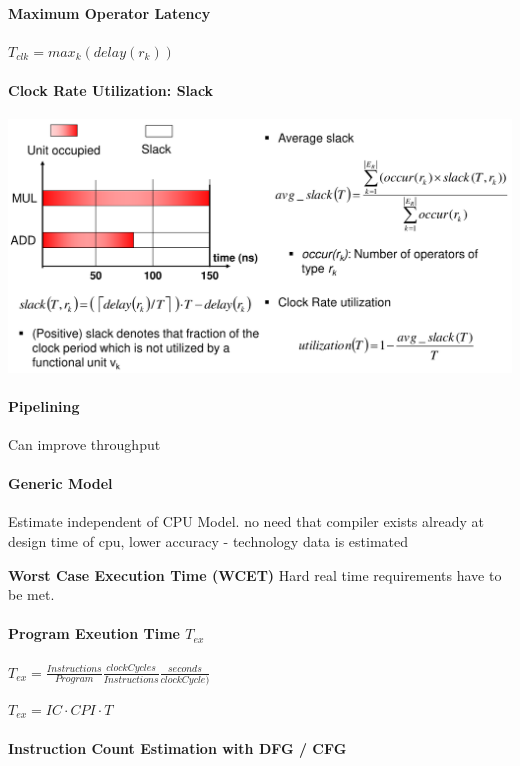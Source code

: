 \documentclass[english]{latex4ei/latex4ei_sheet}
\begin{document}
\paragraph{Maximum Operator Latency}
$T_{clk} = max_k(delay(r_k))$

\paragraph{Clock Rate Utilization: Slack}

\begin{center}
  \includegraphics[width=\linewidth]{assets/Slack.png}
  \label{fig:slack}
\end{center}

\paragraph{Pipelining} Can improve throughput

\paragraph{Generic Model}
Estimate independent of CPU Model. no need that compiler exists already at design time of cpu, lower accuracy - technology data is estimated

\textbf{Worst Case Execution Time (WCET)}
Hard real time requirements have to be met.

\paragraph{Program Exeution Time $T_{ex}$}
$T_{ex} = \frac{Instructions}{Program} \frac{clockCycles}{Instructions} \frac{seconds}{clockCycle)}$

$T_{ex} = IC \cdot CPI \cdot T$

\paragraph{Instruction Count Estimation with DFG / CFG}
\end{document}
